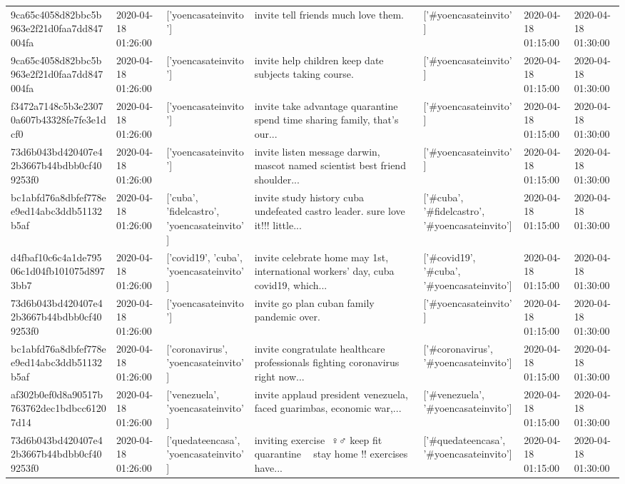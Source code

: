 \begin{tabular}{lllllll}
9ca65c4058d82bbc5b963e2f21d0faa7dd847004fa & 2020-04-18 01:26:00 & ['yoencasateinvito'] & invite tell friends much love them. & ['#yoencasateinvito'] & 2020-04-18 01:15:00 & 2020-04-18 01:30:00 \\
9ca65c4058d82bbc5b963e2f21d0faa7dd847004fa & 2020-04-18 01:26:00 & ['yoencasateinvito'] & invite help children keep date subjects taking course. & ['#yoencasateinvito'] & 2020-04-18 01:15:00 & 2020-04-18 01:30:00 \\
f3472a7148c5b3e23070a607b43328fe7fe3e1dcf0 & 2020-04-18 01:26:00 & ['yoencasateinvito'] & invite take advantage quarantine spend time sharing family, that's our... & ['#yoencasateinvito'] & 2020-04-18 01:15:00 & 2020-04-18 01:30:00 \\
73d6b043bd420407e42b3667b44bdbb0cf409253f0 & 2020-04-18 01:26:00 & ['yoencasateinvito'] & invite listen message darwin, mascot named scientist best friend shoulder... & ['#yoencasateinvito'] & 2020-04-18 01:15:00 & 2020-04-18 01:30:00 \\
bc1abfd76a8dbfef778ee9ed14abc3ddb51132b5af & 2020-04-18 01:26:00 & ['cuba', 'fidelcastro', 'yoencasateinvito'] & invite study history cuba undefeated castro leader. sure love it!!! little... & ['#cuba', '#fidelcastro', '#yoencasateinvito'] & 2020-04-18 01:15:00 & 2020-04-18 01:30:00 \\
d4fbaf10c6c4a1de79506c1d04fb101075d8973bb7 & 2020-04-18 01:26:00 & ['covid19', 'cuba', 'yoencasateinvito'] & invite celebrate home may 1st, international workers' day, cuba covid19, which... & ['#covid19', '#cuba', '#yoencasateinvito'] & 2020-04-18 01:15:00 & 2020-04-18 01:30:00 \\
73d6b043bd420407e42b3667b44bdbb0cf409253f0 & 2020-04-18 01:26:00 & ['yoencasateinvito'] & invite go plan cuban family pandemic over. & ['#yoencasateinvito'] & 2020-04-18 01:15:00 & 2020-04-18 01:30:00 \\
bc1abfd76a8dbfef778ee9ed14abc3ddb51132b5af & 2020-04-18 01:26:00 & ['coronavirus', 'yoencasateinvito'] & invite congratulate healthcare professionals fighting coronavirus right now... & ['#coronavirus', '#yoencasateinvito'] & 2020-04-18 01:15:00 & 2020-04-18 01:30:00 \\
af302b0ef0d8a90517b763762dec1bdbcc61207d14 & 2020-04-18 01:26:00 & ['venezuela', 'yoencasateinvito'] & invite applaud president venezuela, faced guarimbas, economic war,... & ['#venezuela', '#yoencasateinvito'] & 2020-04-18 01:15:00 & 2020-04-18 01:30:00 \\
73d6b043bd420407e42b3667b44bdbb0cf409253f0 & 2020-04-18 01:26:00 & ['quedateencasa', 'yoencasateinvito'] & inviting exercise ️ ♀️♂️ keep fit quarantine 💪💪 stay home !!️ exercises have... & ['#quedateencasa', '#yoencasateinvito'] & 2020-04-18 01:15:00 & 2020-04-18 01:30:00 \\

\end{tabular}
